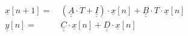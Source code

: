 \begin{equation}
\begin{align*}
\underline{x}[n + 1] =& \ (\underline{\underline{A}} \cdot T + \underline{\underline{I}}) \cdot{} \underline{x}[n] + \underline{\underline{B}}\cdot{}T\cdot{}\underline{x}[n] \\[0.3em]
\underline{y}[n] =& \ \underline{\underline{C}}\cdot \underline{x}[n] + \underline{\underline{D}}\cdot{}\underline{x}[n]
\end{align*} 
\end{equation}

